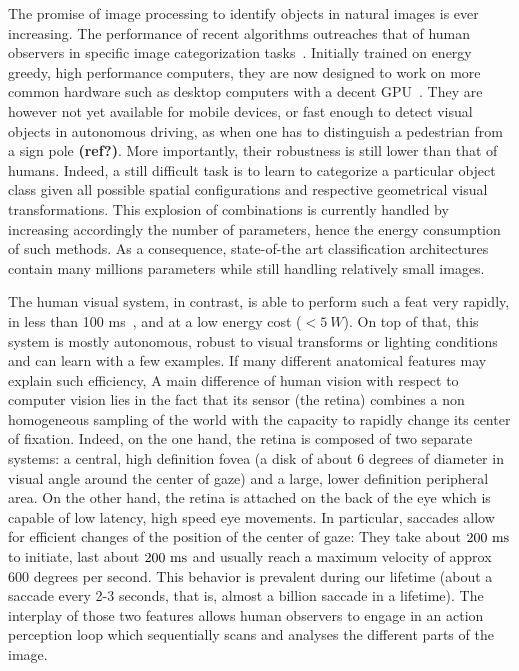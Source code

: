 The promise of image processing to identify objects in natural images is ever increasing. The performance of recent algorithms outreaches that of human observers in specific image categorization tasks~\citep{He15}. Initially trained on energy greedy, high performance computers, they are now designed to work on more common hardware such as desktop computers with a decent GPU~\citep{Sandler18}.
They are however not yet available for mobile devices, or fast enough to detect visual objects in autonomous driving, as when one has to distinguish a pedestrian from a sign pole {\bf (ref?)}. More importantly, their robustness is still lower than that of humans. Indeed, a still difficult task is to learn to categorize a particular object class given all possible spatial configurations and respective geometrical visual transformations. This explosion of combinations is currently handled by increasing accordingly the number of parameters, hence the energy consumption of such methods. As a consequence, state-of-the art classification architectures contain many millions parameters while still handling relatively small images.

The human visual system, in contrast, is able to perform such a feat very rapidly, in less than 100 ms~\citep{Kirchner06}, and at a low energy cost ($<5~W$). On top of that, this system is mostly autonomous, robust to visual transforms or lighting conditions and can learn with a few examples. If many different anatomical features may explain such efficiency,  A main difference of human vision with respect to computer vision lies in the fact that its sensor (the retina) combines a non homogeneous sampling of the world with the capacity to rapidly change its center of fixation. Indeed, on the one hand, the retina is composed of two separate systems: a central, high definition fovea (a disk of about 6 degrees of diameter in visual angle around the center of gaze) and a large, lower definition peripheral area. On the other hand, the retina is attached on the back of the eye which is capable of low latency, high speed eye movements.  In particular, saccades allow for efficient changes of the position of the center of gaze: They take about $200~\si{\milli\second}$ to initiate, last about $200~\si{\milli\second}$ and usually reach a maximum velocity of approx 600 degrees per second. This behavior is prevalent during our lifetime (about a saccade every 2-3 seconds, that is, almost a billion saccade in a lifetime).  The interplay of those two features allows human observers to engage in an action perception loop which sequentially scans and analyses the different parts of the image.


